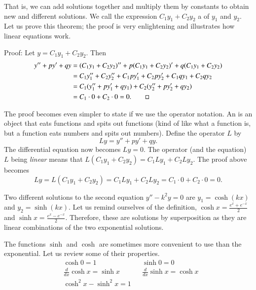 That is, we can add solutions together and multiply them by constants to
obtain new and different solutions.  We call
the expression $C_1 y_1 + C_2 y_2$ a
\emph{} of $y_1$ and $y_2$.
Let us
prove this theorem; the
proof is very enlightening and illustrates how linear equations work.

\medskip

Proof:
Let 
$y = C_1 y_1 + C_2 y_2$.  Then
\begin{equation*}
\begin{split}
y'' + py' + qy & =
(C_1 y_1 + C_2 y_2)'' + p(C_1 y_1 + C_2 y_2)' + q(C_1 y_1 + C_2 y_2) \\
& = C_1 y_1'' + C_2 y_2'' + C_1 p y_1' + C_2 p y_2' + C_1 q y_1 + C_2 q y_2 \\
& = C_1 ( y_1'' + p y_1' + q y_1 ) + C_2 ( y_2'' + p y_2' + q y_2 ) \\
& = C_1 \cdot 0 + C_2 \cdot 0 = 0 . \qed
\end{split}
\end{equation*}

\medskip

The proof becomes even simpler to state if we use the
operator notation.
An \emph{} is an object that eats functions and spits out functions (kind of
like what a function is, but a function eats numbers and spits out numbers).
Define the operator $L$ by
\begin{equation*}
Ly = y'' + py' + qy .
\end{equation*}
The differential equation now becomes $Ly=0$.
The operator (and the equation)
$L$ being \emph{linear} means that $L(C_1y_1 + C_2y_2) = 
C_1 Ly_1 + C_2 Ly_2$.  The proof above becomes
\begin{equation*}
Ly = L(C_1y_1 + C_2y_2) = 
C_1 Ly_1 + C_2 Ly_2 = C_1 \cdot 0 + C_2 \cdot 0 = 0 .
\end{equation*}

\medskip

Two different solutions to the second equation $y'' - k^2y = 0$ are
$y_1 = \cosh (kx)$ and $y_2 = \sinh (kx)$.  Let us remind ourselves of the
definition, $\cosh x = \frac{e^x  + e^{-x}}{2}$ and
$\sinh x = \frac{e^x - e^{-x}}{2}$.  Therefore, these are solutions by
superposition as they
are linear combinations of the two
exponential solutions.

The functions $\sinh$ and $\cosh$ are sometimes more convenient to use than the
exponential.  Let us review some of their properties.
\begin{align*}
& \cosh 0  = 1 &   & \sinh 0 = 0 \\
& \frac{d}{dx} \cosh x = \sinh x &  & \frac{d}{dx} \sinh x = \cosh x \\
& \cosh^2 x - \sinh^2 x = 1
\end{align*}


